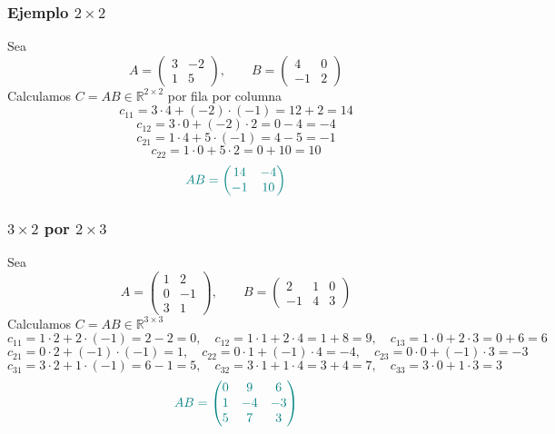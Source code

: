 \documentclass{article}
\begin{document}
\subsubsection*{Ejemplo \(2\times 2\)}
Sea
\[
A=\begin{pmatrix}
3 & -2\\
1 & 5
\end{pmatrix},
\qquad
B=\begin{pmatrix}
4 & 0\\
-1 & 2
\end{pmatrix}
\]
Calculamos \(C=AB\in\mathbb R^{2\times 2}\) por fila por columna
\[
c_{11}=3\cdot 4+(-2)\cdot(-1)=12+2=14
\]
\[
c_{12}=3\cdot 0+(-2)\cdot 2=0-4=-4
\]
\[
c_{21}=1\cdot 4+5\cdot(-1)=4-5=-1
\]
\[
c_{22}=1\cdot 0+5\cdot 2=0+10=10
\]
\[\color{teal}
AB=\begin{pmatrix}14&-4\\ -1&10\end{pmatrix}
\]

\subsubsection*{\(3\times 2\) por \(2\times 3\)}
Sea
\[
A=\begin{pmatrix}
1 & 2\\
0 & -1\\
3 & 1
\end{pmatrix},
\qquad
B=\begin{pmatrix}
2 & 1 & 0\\
-1 & 4 & 3
\end{pmatrix}
\]
Calculamos \(C=AB\in\mathbb R^{3\times 3}\)
\[
c_{11}=1\cdot 2+2\cdot(-1)=2-2=0,\quad
c_{12}=1\cdot 1+2\cdot 4=1+8=9,\quad
c_{13}=1\cdot 0+2\cdot 3=0+6=6
\]
\[
c_{21}=0\cdot 2+(-1)\cdot(-1)=1,\quad
c_{22}=0\cdot 1+(-1)\cdot 4=-4,\quad
c_{23}=0\cdot 0+(-1)\cdot 3=-3
\]
\[
c_{31}=3\cdot 2+1\cdot(-1)=6-1=5,\quad
c_{32}=3\cdot 1+1\cdot 4=3+4=7,\quad
c_{33}=3\cdot 0+1\cdot 3=3
\]
\[ \color{teal}
AB=\begin{pmatrix}
0 & 9 & 6\\
1 & -4 & -3\\
5 & 7 & 3
\end{pmatrix}
\]


\newpage
\printbibliography
\end{document}
